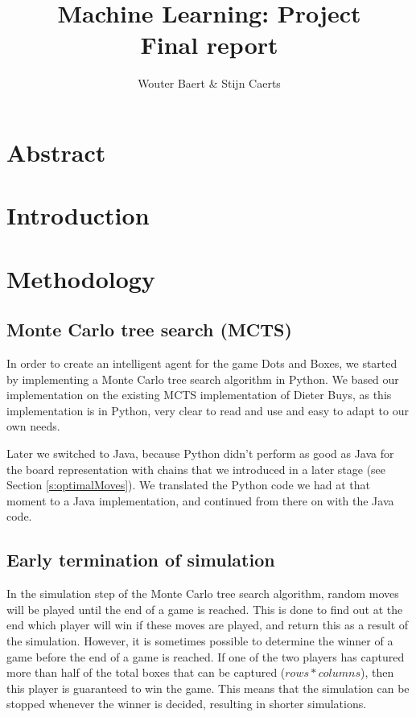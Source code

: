\documentclass[11pt,a4paper,titlepage]{article}
\author{Wouter Baert \& Stijn Caerts}
\title{Machine Learning: Project \\ \small{Final report}}
\begin{document}
	\maketitle
	
	\section*{Abstract}
	
	\tableofcontents
	\newpage
	
	\section{Introduction}
	
	\section{Methodology}
	\subsection{Monte Carlo tree search (MCTS)}
	In order to create an intelligent agent for the game Dots and Boxes, we started by implementing a Monte Carlo tree search algorithm in Python. We based our implementation on the existing MCTS implementation of Dieter Buys\cite{DieterBuys:MCTS}, as this implementation is in Python, very clear to read and use and easy to adapt to our own needs.
	
	Later we switched to Java, because Python didn't perform as good as Java for the board representation with chains that we introduced in a later stage (see Section \ref{s:optimalMoves}). We translated the Python code we had at that moment to a Java implementation, and continued from there on with the Java code.
	
	\subsection{Early termination of simulation}
	In the simulation step of the Monte Carlo tree search algorithm, random moves will be played until the end of a game is reached. This is done to find out at the end which player will win if these moves are played, and return this as a result of the simulation. However, it is sometimes possible to determine the winner of a game before the end of a game is reached. If one of the two players has captured more than half of the total boxes that can be captured ($rows * columns$), then this player is guaranteed to win the game. This means that the simulation can be stopped whenever the winner is decided, resulting in shorter simulations.
	
\end{document}
